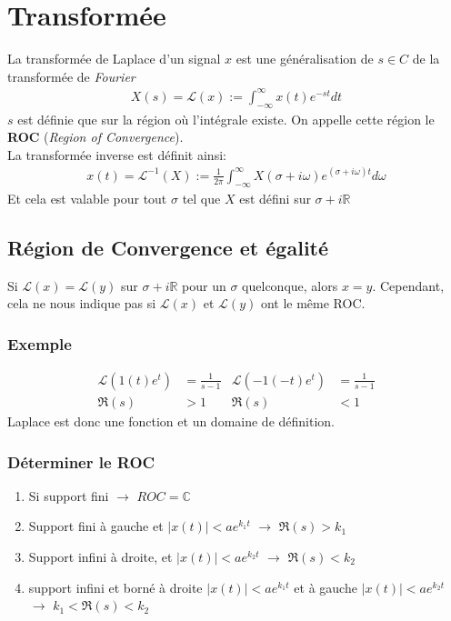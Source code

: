 \documentclass{report}
\begin{document}
\section{Transformée}
La transformée de Laplace d'un signal $x$ est une généralisation de $s \in C$ de la transformée de \textit{Fourier}
\begin{align*}
X(s) = \mathcal{L}(x) := \int_{-\infty}^{\infty} x(t) e^{- s t} dt 
\end{align*}
$s$ est définie que sur la région où l'intégrale existe. On appelle cette région le \textbf{ROC} (\textit{Region of Convergence}).\\
La transformée inverse est définit ainsi:
\begin{align*}
x(t) = \mathcal{L}^{-1}(X) := \frac{1}{2 \pi} \int_{-\infty}^{\infty} X( \sigma + i \omega ) e^{(\sigma + i \omega)t } d \omega
\end{align*}
Et cela est valable pour tout $\sigma$ tel que $X$ est défini sur $\sigma + i \mathbb{R}$

\subsection{Région de Convergence et égalité}
Si $\mathcal{L}(x) = \mathcal{L}(y)$ sur $\sigma + i \mathbb{R}$ pour un $\sigma$ quelconque, alors $x=y$. Cependant, cela ne nous indique pas si $\mathcal{L}(x)$ et $\mathcal{L}(y)$ ont le même ROC.
\subsubsection{Exemple}
\begin{align*}
\mathcal{L}(1(t) e^t) &= \frac{1}{s-1} & \mathcal{L}(-1(-t) e^t) &= \frac{1}{s-1}\\
\mathfrak{R}(s) &> 1 & \mathfrak{R}(s) &< 1 
\end{align*}
Laplace est donc une fonction et un domaine de définition.

\subsubsection{Déterminer le ROC}
\begin{enumerate}
\item Si support fini $\rightarrow$ $ROC = \mathbb{C}$
\item Support fini à gauche et $|x(t)| < a e^{k_1 t}$ $\rightarrow$ $\mathfrak{R}(s) > k_1$
\item Support infini à droite, et $|x(t)| < a e^{k_2 t}$ $\rightarrow$ $\mathfrak{R}(s) < k_2$
\item support infini et borné à droite $|x(t)|< a e^{k_1 t}$ et à gauche $|x(t)| < a e^{k_2 t}$ $\rightarrow$ $k_1 < \mathfrak{R}(s) < k_2$
\end{enumerate}
\end{document}
